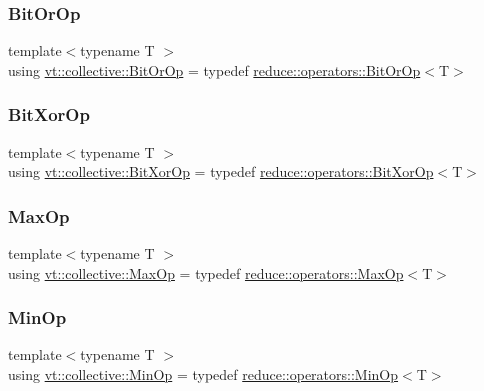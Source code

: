\subsubsection{\texorpdfstring{Bit\+Or\+Op}{BitOrOp}}
{\footnotesize\ttfamily template$<$typename T $>$ \\
using \hyperlink{namespacevt_1_1collective_a07085d466f47337de6f1d6ea30023c11}{vt\+::collective\+::\+Bit\+Or\+Op} = typedef \hyperlink{structvt_1_1collective_1_1reduce_1_1operators_1_1_bit_or_op}{reduce\+::operators\+::\+Bit\+Or\+Op}$<$T$>$}

\mbox{\label{namespacevt_1_1collective_a834c8e21559219187ec9ef79f72cf474}} 
\subsubsection{\texorpdfstring{Bit\+Xor\+Op}{BitXorOp}}
{\footnotesize\ttfamily template$<$typename T $>$ \\
using \hyperlink{namespacevt_1_1collective_a834c8e21559219187ec9ef79f72cf474}{vt\+::collective\+::\+Bit\+Xor\+Op} = typedef \hyperlink{structvt_1_1collective_1_1reduce_1_1operators_1_1_bit_xor_op}{reduce\+::operators\+::\+Bit\+Xor\+Op}$<$T$>$}

\mbox{\label{namespacevt_1_1collective_aee17b1e7ed3266f7407f01253ecc2807}} 
\subsubsection{\texorpdfstring{Max\+Op}{MaxOp}}
{\footnotesize\ttfamily template$<$typename T $>$ \\
using \hyperlink{namespacevt_1_1collective_aee17b1e7ed3266f7407f01253ecc2807}{vt\+::collective\+::\+Max\+Op} = typedef \hyperlink{structvt_1_1collective_1_1reduce_1_1operators_1_1_max_op}{reduce\+::operators\+::\+Max\+Op}$<$T$>$}

\mbox{\label{namespacevt_1_1collective_a0d9f013f61a3e2a15a9e0491409f50f2}} 
\subsubsection{\texorpdfstring{Min\+Op}{MinOp}}
{\footnotesize\ttfamily template$<$typename T $>$ \\
using \hyperlink{namespacevt_1_1collective_a0d9f013f61a3e2a15a9e0491409f50f2}{vt\+::collective\+::\+Min\+Op} = typedef \hyperlink{structvt_1_1collective_1_1reduce_1_1operators_1_1_min_op}{reduce\+::operators\+::\+Min\+Op}$<$T$>$}

